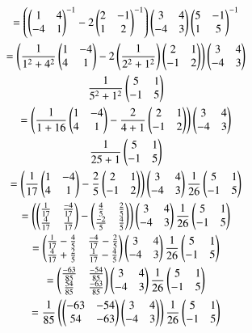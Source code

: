 \documentclass[journal,12pt,twocolumn]{IEEEtran}
\begin{document}
\begin{multline}
 =\brak{\myvec{1 & 4 \\ -4 & 1}^{-1} - 2\myvec{2 & -1 \\ 1 & 2}^{-1}}\myvec{3 & 4 \\ -4 & 3}\myvec{5 & -1 \\ 1 & 5}^{-1}\\
 =\brak{\frac{1}{1^2 + 4^2}\myvec{1 & -4 \\ 4 & 1} - 2\brak{\frac{1}{2^2 + 1^2}}\myvec{2 & 1 \\ -1 & 2}}\myvec{3 & 4\\ -4 & 3}\\
   \frac{1}{5^2 + 1^2}\myvec{5 & 1 \\ -1 & 5}\\
 =\brak{\frac{1}{1+16}\myvec{1 & -4 \\ 4 & 1} -\frac{2}{4+1}\myvec{2 & 1 \\ -1 & 2}}\myvec{3 & 4\\ -4 & 3}\\
    \frac{1}{25+1}\myvec{5 & 1 \\ -1 & 5}\\
  =\brak{\frac{1}{17}\myvec{1 & -4 \\4 & 1} -\frac{2}{5}\myvec{2 & 1 \\ -1 & 2}}\myvec{3 & 4 \\ -4 & 3}\frac{1}{26}\myvec{5 & 1 \\ -1 & 5}\\
 =\brak{\myvec{\frac{1}{17} & \frac{-4}{17} \\ \frac{4}{17} & \frac{1}{17}} - \myvec{\frac{4}{5} & \frac{2}{5} \\ \frac{-2}{5} & \frac{4}{5}}}\myvec{3 & 4 \\ -4 & 3}\frac{1}{26}\myvec{5 & 1 \\ -1 & 5}\\
 =\myvec{\frac{1}{17}-\frac{4}{5} & \frac{-4}{17}-\frac{2}{5} \\ \frac{4}{17}+\frac{2}{5} & \frac{1}{17}-\frac{4}{5}}\myvec{3 & 4 \\ -4 & 3}\frac{1}{26}\myvec{5 & 1 \\ -1 & 5}\\
 =\myvec{\frac{-63}{85} & \frac{-54}{85} \\ \frac{54}{85} & \frac{-63}{85}}\myvec{3 & 4\\ -4 & 3}\frac{1}{26}\myvec{5 & 1 \\ -1 & 5}\\
 = \frac{1}{85}\brak{\myvec{-63 & -54 \\ 54 & -63} \myvec{3 & 4 \\-4 & 3}  } \frac{1}{26}\myvec{5 & 1 \\ -1 & 5}\\

\end{multline}
\end{document}
